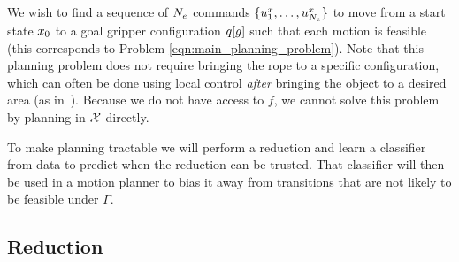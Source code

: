 We wish to find a sequence of $N_e$ commands $\{u^x_1, \dots, u^x_{N_e} \}$ to move from a start state $x_0$ to a goal gripper configuration $q[g]$ such that each motion is feasible (this corresponds to Problem \eqref{eqn:main_planning_problem}). Note that this planning problem does not require bringing the rope to a specific configuration, which can often be done using local control \textit{after} bringing the object to a desired area (as in~\cite{McConachie2020}). %
Because we do not have access to $f$, we cannot solve this problem by planning in $\mathcal{X}$ directly.





To make planning tractable we will perform a reduction and learn a classifier from data to predict when the reduction can be trusted. That classifier will then be used in a motion planner to bias it away from transitions that are not likely to be feasible under $\Gamma$.


\subsection{Reduction}

\label{sec:isrr_model_approx}

